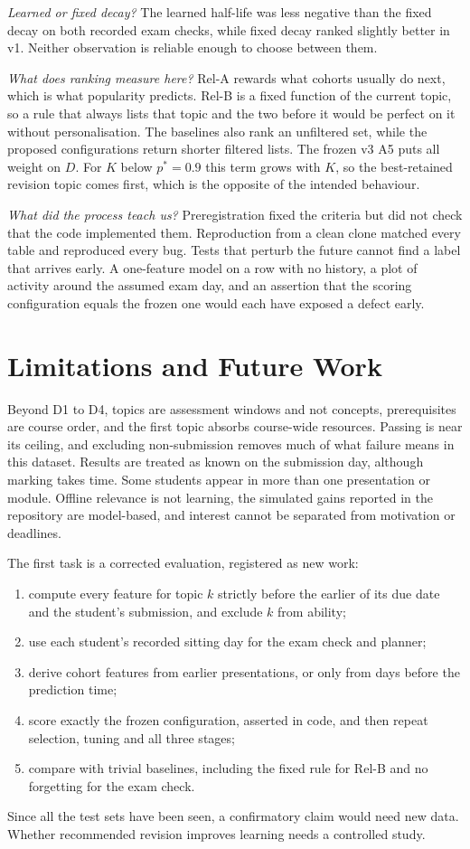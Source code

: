 \documentclass[conference]{IEEEtran}
\begin{document}
\emph{Learned or fixed decay?} The learned half-life was less negative than the fixed decay on both recorded exam checks, while fixed decay ranked slightly better in v1. Neither observation is reliable enough to choose between them.

\emph{What does ranking measure here?} Rel-A rewards what cohorts usually do next, which is what popularity predicts. Rel-B is a fixed function of the current topic, so a rule that always lists that topic and the two before it would be perfect on it without personalisation. The baselines also rank an unfiltered set, while the proposed configurations return shorter filtered lists. The frozen v3 A5 puts all weight on $D$. For $K$ below $p^*=0.9$ this term grows with $K$, so the best-retained revision topic comes first, which is the opposite of the intended behaviour.

\emph{What did the process teach us?} Preregistration fixed the criteria but did not check that the code implemented them. Reproduction from a clean clone matched every table and reproduced every bug. Tests that perturb the future cannot find a label that arrives early. A one-feature model on a row with no history, a plot of activity around the assumed exam day, and an assertion that the scoring configuration equals the frozen one would each have exposed a defect early.

\section{Limitations and Future Work}
Beyond D1 to D4, topics are assessment windows and not concepts, prerequisites are course order, and the first topic absorbs course-wide resources. Passing is near its ceiling, and excluding non-submission removes much of what failure means in this dataset. Results are treated as known on the submission day, although marking takes time. Some students appear in more than one presentation or module. Offline relevance is not learning, the simulated gains reported in the repository are model-based, and interest cannot be separated from motivation or deadlines.

The first task is a corrected evaluation, registered as new work:
\begin{enumerate}
\item compute every feature for topic $k$ strictly before the earlier of its due date and the student's submission, and exclude $k$ from ability;
\item use each student's recorded sitting day for the exam check and planner;
\item derive cohort features from earlier presentations, or only from days before the prediction time;
\item score exactly the frozen configuration, asserted in code, and then repeat selection, tuning and all three stages;
\item compare with trivial baselines, including the fixed rule for Rel-B and no forgetting for the exam check.
\end{enumerate}
Since all the test sets have been seen, a confirmatory claim would need new data. Whether recommended revision improves learning needs a controlled study.
\end{document}
